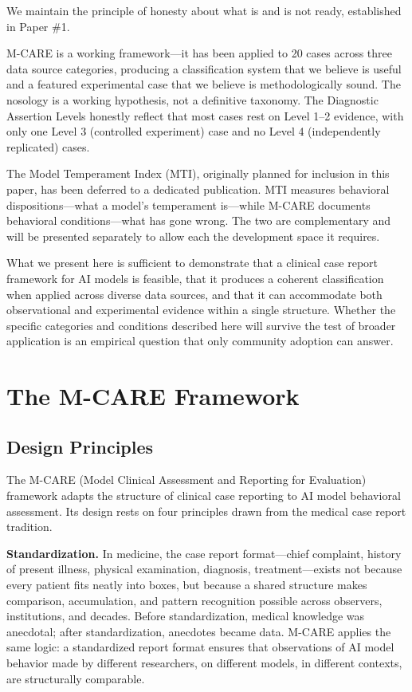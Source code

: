 \documentclass[11pt]{article}
\begin{document}
We maintain the principle of honesty about what is and is not ready, established in Paper \#1.

M-CARE is a working framework---it has been applied to 20 cases across three data source categories, producing a classification system that we believe is useful and a featured experimental case that we believe is methodologically sound. The nosology is a working hypothesis, not a definitive taxonomy. The Diagnostic Assertion Levels honestly reflect that most cases rest on Level 1--2 evidence, with only one Level 3 (controlled experiment) case and no Level 4 (independently replicated) cases.

The Model Temperament Index (MTI), originally planned for inclusion in this paper, has been deferred to a dedicated publication. MTI measures behavioral dispositions---what a model's temperament is---while M-CARE documents behavioral conditions---what has gone wrong. The two are complementary and will be presented separately to allow each the development space it requires.

What we present here is sufficient to demonstrate that a clinical case report framework for AI models is feasible, that it produces a coherent classification when applied across diverse data sources, and that it can accommodate both observational and experimental evidence within a single structure. Whether the specific categories and conditions described here will survive the test of broader application is an empirical question that only community adoption can answer.

\section{The M-CARE Framework}

\subsection{Design Principles}

The M-CARE (Model Clinical Assessment and Reporting for Evaluation) framework adapts the structure of clinical case reporting to AI model behavioral assessment. Its design rests on four principles drawn from the medical case report tradition.

\textbf{Standardization.} In medicine, the case report format---chief complaint, history of present illness, physical examination, diagnosis, treatment---exists not because every patient fits neatly into boxes, but because a shared structure makes comparison, accumulation, and pattern recognition possible across observers, institutions, and decades. Before standardization, medical knowledge was anecdotal; after standardization, anecdotes became data. M-CARE applies the same logic: a standardized report format ensures that observations of AI model behavior made by different researchers, on different models, in different contexts, are structurally comparable.
\end{document}
